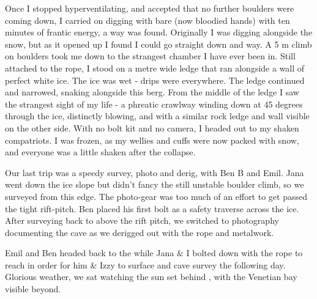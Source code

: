 Once I stopped hyperventilating, and accepted that no further boulders
were coming down, I carried on digging with bare (now bloodied hands)
with ten minutes of frantic energy, a way was found. Originally I was
digging alongside the snow, but as it opened up I found I could go
straight down and way. A 5 m climb on boulders took me down to the
strangest chamber I have ever been in. Still attached to the rope, I
stood on a metre wide ledge that ran alongside a wall of perfect white
ice. The ice was wet - drips were everywhere. The ledge continued and
narrowed, snaking alongside this berg. From the middle of the ledge I
saw the strangest sight of my life - a phreatic crawlway winding down at
45 degrees through the ice, distinctly blowing, and with a similar rock
ledge and wall visible on the other side. With no bolt kit and no
camera, I headed out to my shaken compatriots. I was frozen, as my
wellies and cuffs were now packed with snow, and everyone was a little
shaken after the collapse.


Our last trip was a speedy survey, photo and derig, with Ben B and Emil.
Jana went down the ice slope but didn't fancy the still unstable boulder
climb, so we surveyed from this edge. The photo-gear was too much of an
effort to get passed the tight rift-pitch. Ben placed his first bolt as
a safety traverse across the ice. After surveying back to above the rift
pitch, we switched to photography documenting the cave as we derigged
out with the rope and metalwork.

Emil and Ben headed back to the  while Jana \& I bolted down with
the  rope to reach  in order for him \& Izzy to surface and cave survey the following day. Glorious weather, we sat watching the sun set behind , with the Venetian bay visible beyond.


